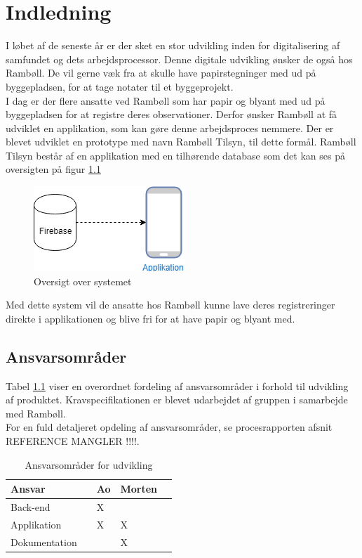 \chapter{Indledning}

I løbet af de seneste år er der sket en stor udvikling inden for digitalisering af samfundet og dets arbejdsprocessor. Denne digitale udvikling ønsker de også hos Rambøll. De vil gerne væk fra at skulle have papirstegninger med ud på byggepladsen, for at tage notater til et byggeprojekt. \\
I dag er der flere ansatte ved Rambøll som har papir og blyant med ud på byggepladsen for at registre deres observationer. Derfor ønsker Rambøll at få udviklet en applikation, som kan gøre denne arbejdsproces nemmere.
Der er blevet udviklet en prototype med navn Rambøll Tilsyn, til dette formål.
Rambøll Tilsyn består af en applikation med en tilhørende database som det kan ses på oversigten på figur \ref{fig:OversigtSystembeskrivelse}


\begin{figure}[H]
	\centering
	\includegraphics[width=0.4\linewidth]{Indledning/Oversigtoversystem}
	\caption{Oversigt over systemet}
	\label{fig:OversigtSystembeskrivelse}
\end{figure}

Med dette system vil de ansatte hos Rambøll kunne lave deres registreringer direkte i applikationen og blive fri for at have papir og blyant med. \\

\section*{Ansvarsområder}
Tabel \ref{Produktansvar} viser en overordnet fordeling af ansvarsområder i forhold til udvikling af produktet. Kravspecifikationen er blevet udarbejdet af gruppen i samarbejde med Rambøll. \\
For en fuld detaljeret opdeling af ansvarsområder, se procesrapporten afsnit REFERENCE MANGLER !!!!.

\begin{table}[H]
	\centering
	\begin{tabular}{lllll} \hline
		\textbf{Ansvar} &  & \textbf{Ao}&  \textbf{Morten}&  \\ \hline
		Back-end&  &  X&  &  \\ \hline
		Applikation&  &  X&  X&  \\ \hline
		Dokumentation& & & X& \\ \hline
	\end{tabular}
	\caption{Ansvarsområder for udvikling}
	\label{Produktansvar}
\end{table}